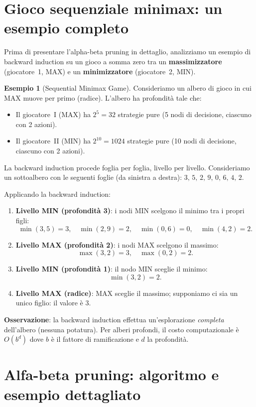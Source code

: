 \documentclass[12pt,a4paper,twoside]{book}
\theoremstyle{plain}
\theoremstyle{definition}
\newtheorem{example}[theorem]{Esempio}
\begin{document}
\section{Gioco sequenziale minimax: un esempio completo}

Prima di presentare l'alpha-beta pruning in dettaglio, analizziamo un esempio di backward induction su un gioco a somma zero tra un \textbf{massimizzatore} (giocatore~1, MAX) e un \textbf{minimizzatore} (giocatore~2, MIN).

\begin{example}[Sequential Minimax Game]
Consideriamo un albero di gioco in cui MAX muove per primo (radice). L'albero ha profondità tale che:
\begin{itemize}
  \item Il giocatore~I (MAX) ha $2^5 = 32$ strategie pure (5 nodi di decisione, ciascuno con 2 azioni).
  \item Il giocatore~II (MIN) ha $2^{10} = 1024$ strategie pure (10 nodi di decisione, ciascuno con 2 azioni).
\end{itemize}
La backward induction procede foglia per foglia, livello per livello. Consideriamo un sottoalbero con le seguenti foglie (da sinistra a destra): $3,\,5,\,2,\,9,\,0,\,6,\,4,\,2$.

Applicando la backward induction:
\begin{enumerate}
  \item \textbf{Livello MIN (profondità 3)}: i nodi MIN scelgono il minimo tra i propri figli:
    \[\min(3,5)=3,\quad \min(2,9)=2,\quad \min(0,6)=0,\quad \min(4,2)=2.\]
  \item \textbf{Livello MAX (profondità 2)}: i nodi MAX scelgono il massimo:
    \[\max(3,2)=3,\quad \max(0,2)=2.\]
  \item \textbf{Livello MIN (profondità 1)}: il nodo MIN sceglie il minimo:
    \[\min(3,2)=2.\]
  \item \textbf{Livello MAX (radice)}: MAX sceglie il massimo; supponiamo ci sia un unico figlio: il valore è $\boxed{3}$.
\end{enumerate}

\textbf{Osservazione}: la backward induction effettua un'esplorazione \emph{completa} dell'albero (nessuna potatura). Per alberi profondi, il costo computazionale è $O(b^d)$ dove $b$ è il fattore di ramificazione e $d$ la profondità.
\end{example}

\section{Alfa-beta pruning: algoritmo e esempio dettagliato}
\end{document}

